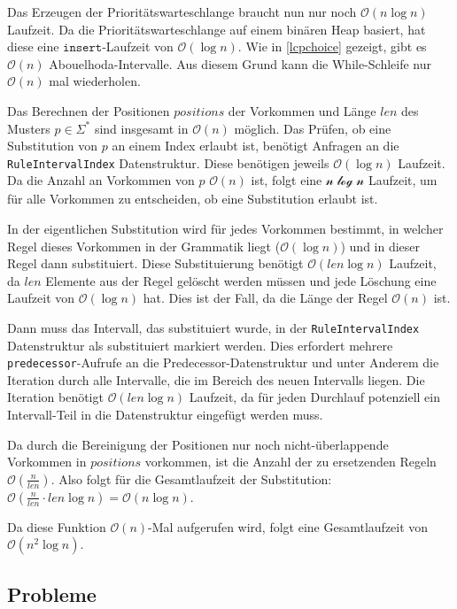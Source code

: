 Das Erzeugen der Prioritätswarteschlange braucht nun nur noch $\mathcal{O}(n \log n)$ Laufzeit. Da die Prioritätswarteschlange auf einem binären Heap basiert, hat diese eine $\texttt{insert}$-Laufzeit von $\mathcal{O}(\log n)$. Wie in \autoref{lcpchoice} gezeigt, gibt es $\mathcal{O}(n)$ Abouelhoda-Intervalle. Aus diesem Grund kann die While-Schleife nur $\mathcal{O}(n)$ mal wiederholen.

Das Berechnen der Positionen $positions$ der Vorkommen und Länge $len$ des Musters $p \in \Sigma^*$ sind insgesamt in $\mathcal{O}(n)$ möglich. 
Das Prüfen, ob eine Substitution von $p$ an einem Index erlaubt ist, benötigt Anfragen an die \texttt{RuleIntervalIndex} Datenstruktur.
Diese benötigen jeweils $\mathcal{O}(\log n)$ Laufzeit. Da die Anzahl an Vorkommen von $p$ $\mathcal{O}(n)$ ist, folgt eine $\mathcal{n \log n}$ Laufzeit, um für alle Vorkommen zu entscheiden, ob eine Substitution erlaubt ist.

In der eigentlichen Substitution wird für jedes Vorkommen bestimmt, in welcher Regel dieses Vorkommen in der Grammatik liegt ($\mathcal{O}(\log n)$) und in dieser Regel dann substituiert. Diese Substituierung benötigt $\mathcal{O}(len \log n)$ Laufzeit, da $len$ Elemente aus der Regel gelöscht werden müssen und jede Löschung eine Laufzeit von $\mathcal{O}(\log n)$ hat. Dies ist der Fall, da die Länge der Regel $\mathcal{O}(n)$ ist.

Dann muss das Intervall, das substituiert wurde, in der \texttt{RuleIntervalIndex} Datenstruktur als substituiert markiert werden.
Dies erfordert mehrere \texttt{predecessor}-Aufrufe an die Predecessor-Datenstruktur und unter Anderem die Iteration durch alle Intervalle, die im Bereich des neuen Intervalls liegen. Die Iteration benötigt $\mathcal{O}(len \log n)$ Laufzeit, da für jeden Durchlauf potenziell ein Intervall-Teil in die Datenstruktur eingefügt werden muss. 

Da durch die Bereinigung der Positionen nur noch nicht-überlappende Vorkommen in $positions$ vorkommen, ist die Anzahl der zu ersetzenden Regeln $\mathcal{O}(\tfrac{n}{len})$. Also folgt für die Gesamtlaufzeit der Substitution: $\mathcal{O}(\tfrac{n}{len} \cdot len \log n) = \mathcal{O}(n \log n)$.

Da diese Funktion $\mathcal{O}(n)$-Mal aufgerufen wird, folgt eine Gesamtlaufzeit von $\mathcal{O}(n^2 \log n)$.

\subsection{Probleme}
\label{v3problems}

